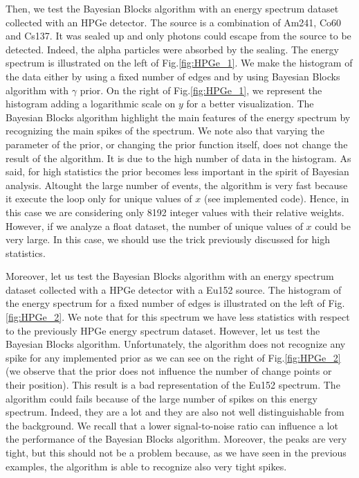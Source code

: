 \documentclass[prb,twocolumn]{revtex4-1}
\begin{document}
Then, we test the Bayesian Blocks algorithm with an energy spectrum dataset collected with an HPGe detector. The source is a combination of Am241, Co60 and Cs137. It was sealed up and only photons could escape from the source to be detected. Indeed, the alpha particles were absorbed by the sealing. The energy spectrum is illustrated on the left of Fig.\ref{fig:HPGe_1}.
We make the histogram of the data either by using a fixed number of edges and by using Bayesian Blocks algorithm with $\gamma$ prior. On the right of Fig.\ref{fig:HPGe_1}, we represent the histogram adding a logarithmic scale on $y$ for a better visualization.
The Bayesian Blocks algorithm highlight the main features of the energy spectrum by recognizing the main spikes of the spectrum.
We note also that varying the parameter of the prior, or changing the prior function itself, does not change the result of the algorithm. It is due to the high number of data in the histogram. As said, for high statistics the prior becomes less important in the spirit of Bayesian analysis.
Altought the large number of events, the algorithm is very fast because it execute the loop only for unique values of $x$ (see implemented code). Hence, in this case we are considering only 8192 integer values with their relative weights.
However, if we analyze a float dataset, the number of unique values of $x$ could be very large. 
In this case, we should use the trick previously discussed for high statistics.

Moreover, let us test the Bayesian Blocks algorithm with an energy spectrum dataset collected with a HPGe detector with a Eu152 source. The histogram of the energy spectrum for a fixed number of edges is illustrated on the left of Fig.\ref{fig:HPGe_2}.
We note that for this spectrum we have less statistics with respect to the previously HPGe energy spectrum dataset. However, let us test the Bayesian Blocks algorithm.
Unfortunately, the algorithm does not recognize any spike for any implemented prior  as we can see on the right of Fig.\ref{fig:HPGe_2} (we observe that the prior does not influence the number of change points or their position). This result is a bad representation of the Eu152 spectrum. The algorithm could fails because of the large number of spikes on this energy spectrum. Indeed, they are a lot and they are also not well distinguishable from the background. We recall that a lower signal-to-noise ratio can influence a lot the performance of the Bayesian Blocks algorithm.
Moreover, the peaks are very tight, but this should not be a problem because, as we have seen in the previous examples, the algorithm is able to recognize also very tight spikes.
\end{document}
